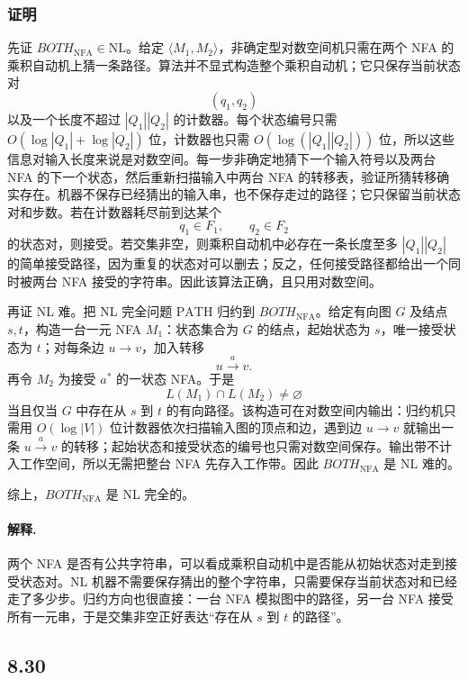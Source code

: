 \begin{answerred}
\subsubsection*{证明}

先证 $BOTH_{\mathrm{NFA}}\in\mathrm{NL}$。给定 $\langle M_1,M_2\rangle$，非确定型对数空间机只需在两个 NFA 的乘积自动机上猜一条路径。算法并不显式构造整个乘积自动机；它只保存当前状态对
\[
(q_1,q_2)
\]
以及一个长度不超过 $|Q_1||Q_2|$ 的计数器。每个状态编号只需 $O(\log |Q_1|+\log |Q_2|)$ 位，计数器也只需 $O(\log(|Q_1||Q_2|))$ 位，所以这些信息对输入长度来说是对数空间。每一步非确定地猜下一个输入符号以及两台 NFA 的下一个状态，然后重新扫描输入中两台 NFA 的转移表，验证所猜转移确实存在。机器不保存已经猜出的输入串，也不保存走过的路径；它只保留当前状态对和步数。若在计数器耗尽前到达某个
\[
q_1\in F_1,\qquad q_2\in F_2
\]
的状态对，则接受。若交集非空，则乘积自动机中必存在一条长度至多 $|Q_1||Q_2|$ 的简单接受路径，因为重复的状态对可以删去；反之，任何接受路径都给出一个同时被两台 NFA 接受的字符串。因此该算法正确，且只用对数空间。

再证 NL 难。把 NL 完全问题 $\mathrm{PATH}$ 归约到 $BOTH_{\mathrm{NFA}}$。给定有向图 $G$ 及结点 $s,t$，构造一台一元 NFA $M_1$：状态集合为 $G$ 的结点，起始状态为 $s$，唯一接受状态为 $t$；对每条边 $u\to v$，加入转移
\[
u\xrightarrow{a}v.
\]
再令 $M_2$ 为接受 $a^*$ 的一状态 NFA。于是
\[
L(M_1)\cap L(M_2)\neq\varnothing
\]
当且仅当 $G$ 中存在从 $s$ 到 $t$ 的有向路径。该构造可在对数空间内输出：归约机只需用 $O(\log |V|)$ 位计数器依次扫描输入图的顶点和边，遇到边 $u\to v$ 就输出一条 $u\xrightarrow{a}v$ 的转移；起始状态和接受状态的编号也只需对数空间保存。输出带不计入工作空间，所以无需把整台 NFA 先存入工作带。因此 $BOTH_{\mathrm{NFA}}$ 是 NL 难的。

综上，$BOTH_{\mathrm{NFA}}$ 是 NL 完全的。

\begin{answernote}
\paragraph{解释.}
两个 NFA 是否有公共字符串，可以看成乘积自动机中是否能从初始状态对走到接受状态对。NL 机器不需要保存猜出的整个字符串，只需要保存当前状态对和已经走了多少步。归约方向也很直接：一台 NFA 模拟图中的路径，另一台 NFA 接受所有一元串，于是交集非空正好表达“存在从 $s$ 到 $t$ 的路径”。

\end{answernote}
\end{answerred}
\subsection*{8.30}

